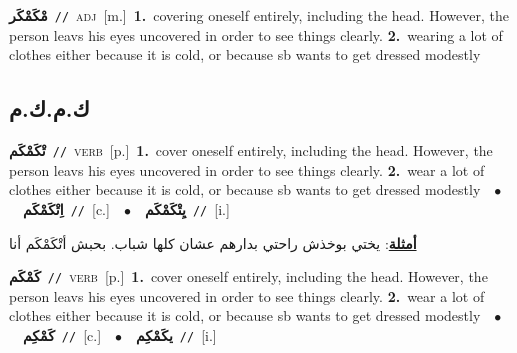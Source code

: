 \documentclass[10pt,a4paper,twoside]{article} %
\begin{document}
\begin{multicols}{2}
{\setlength\topsep{0pt}\textbf{\foreignlanguage{arabic}{مْكَمْكَر}}\ {\color{gray}\texttt{//}\color{black}}\ \textsc{adj}\ [m.]\ \textbf{1.}~covering oneself entirely, including the head. However, the person leavs his eyes uncovered in order to see things clearly.  \textbf{2.}~wearing a lot of clothes either because it is cold, or because sb wants to get dressed modestly\ } \vspace{2mm}

\vspace{-3mm}
\subsection*{\color{blue}\foreignlanguage{arabic}{ك.م.ك.م}\color{blue}{}} 

{\setlength\topsep{0pt}\textbf{\foreignlanguage{arabic}{تْكَمْكَم}}\ {\color{gray}\texttt{//}\color{black}}\ \textsc{verb}\ [p.]\ \textbf{1.}~cover oneself entirely, including the head. However, the person leavs his eyes uncovered in order to see things clearly.  \textbf{2.}~wear a lot of clothes either because it is cold, or because sb wants to get dressed modestly\ \ $\bullet$\ \ \setlength\topsep{0pt}\textbf{\foreignlanguage{arabic}{اِتْكَمْكَم}}\ {\color{gray}\texttt{//}\color{black}}\ [c.]\ \ $\bullet$\ \ \setlength\topsep{0pt}\textbf{\foreignlanguage{arabic}{يِتْكَمْكَم}}\ {\color{gray}\texttt{//}\color{black}}\ [i.]\  \begin{flushright}\color{gray}\foreignlanguage{arabic}{\textbf{\underline{\foreignlanguage{arabic}{أمثلة}}}: يختي بوخذش راحتي بدارهم عشان كلها شباب. بحبش أتْكَمْكَم أنا}\end{flushright}\color{black}} \vspace{2mm}

{\setlength\topsep{0pt}\textbf{\foreignlanguage{arabic}{كَمْكَم}}\ {\color{gray}\texttt{//}\color{black}}\ \textsc{verb}\ [p.]\ \textbf{1.}~cover oneself entirely, including the head. However, the person leavs his eyes uncovered in order to see things clearly.  \textbf{2.}~wear a lot of clothes either because it is cold, or because sb wants to get dressed modestly\ \ $\bullet$\ \ \setlength\topsep{0pt}\textbf{\foreignlanguage{arabic}{كَمْكِم}}\ {\color{gray}\texttt{//}\color{black}}\ [c.]\ \ $\bullet$\ \ \setlength\topsep{0pt}\textbf{\foreignlanguage{arabic}{يكَمْكِم}}\ {\color{gray}\texttt{//}\color{black}}\ [i.]\ } \vspace{2mm}


\end{multicols}
\end{document}
